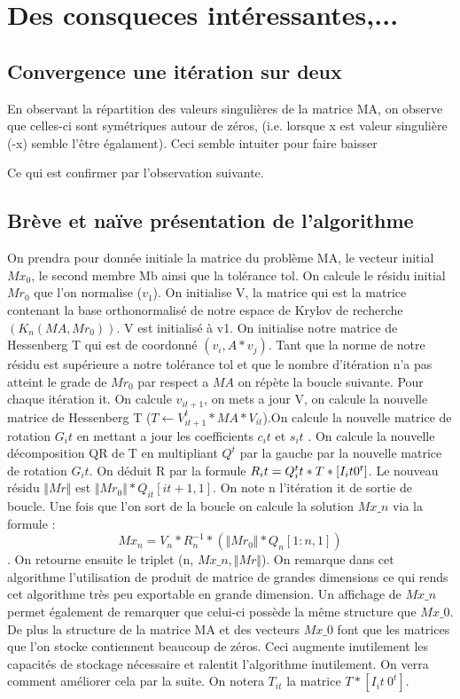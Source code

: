 \documentclass[12 pt]{article}
\begin{document}
\section{Des consqueces intéressantes,...}

\subsection*{Convergence une itération sur deux}

En observant la répartition des valeurs singulières de la matrice MA, on observe que celles-ci sont symétriques autour de zéros, (i.e. lorsque x est valeur singulière (-x) semble l'être égalament). Ceci semble intuiter pour faire baisser

Ce qui est confirmer par l'observation suivante. 
  



\subsection*{Brève et naïve présentation de l'algorithme}

On prendra pour donnée initiale la matrice du problème MA, le vecteur initial $Mx_{0}$, le second membre Mb ainsi que la tolérance tol. On calcule le résidu initial $Mr_{0}$ que l'on normalise ($v_{1}$). 
On initialise V, la matrice qui est la matrice contenant la base orthonormalisé de notre espace de Krylov de recherche $(K_{n}(MA, Mr_{0}))$. V est initialisé à v1. On initialise notre matrice de Hessenberg T 
qui est de coordonné $(v_{i},A*v_{j})$. Tant que la norme de notre résidu est supérieure a notre tolérance tol et que le nombre d'itération n'a pas atteint le grade de $Mr_{0}$ par respect a $MA$ on répète la boucle suivante.
Pour chaque itération it. On calcule $v_{it+1}$, on mets a jour V, on calcule la nouvelle matrice de Hessenberg T ($T \leftarrow V^t_{it+1}*MA*V_{it}$).On calcule la nouvelle matrice de rotation $G_it$ en mettant a jour les coefficients $c_it$ et $s_it$ .
On calcule la nouvelle décomposition QR de T en multipliant $Q^t$ par la gauche par la nouvelle matrice de rotation $G_it$. On déduit R par la formule $R_it = Q^t_it*T*[I_it \\ 0^t ]$. 
Le nouveau résidu $ \Vert Mr \Vert$ est $\Vert Mr_{0} \Vert *Q_{it}[it+1,1]$. On note n l'itération it de sortie de boucle.
Une fois que l'on sort de la boucle on calcule la solution $Mx\_n$ via la formule :
  \[ Mx_n = V_n*R^{-1}_n*(\Vert Mr_0 \Vert *Q_{n}[1:n,1]) \].
On retourne ensuite le triplet (n, $Mx\_n, \Vert Mr \Vert$).
On remarque dans cet algorithme l'utilisation de produit de matrice de grandes dimensions ce qui rends cet algorithme très peu exportable en grande dimension.
Un affichage de $Mx\_n$ permet également de remarquer que celui-ci possède la même structure que $Mx\_0$.
De plus la structure de la matrice MA et des vecteurs $Mx\_0$ font que les matrices que l'on stocke contiennent beaucoup de zéros. Ceci augmente inutilement les capacités de stockage nécessaire et ralentit l'algorithme inutilement.
On verra comment améliorer cela par la suite.
On notera $T_{it}$ la matrice $T*[I_it \ 0^t] $.
\end{document}

